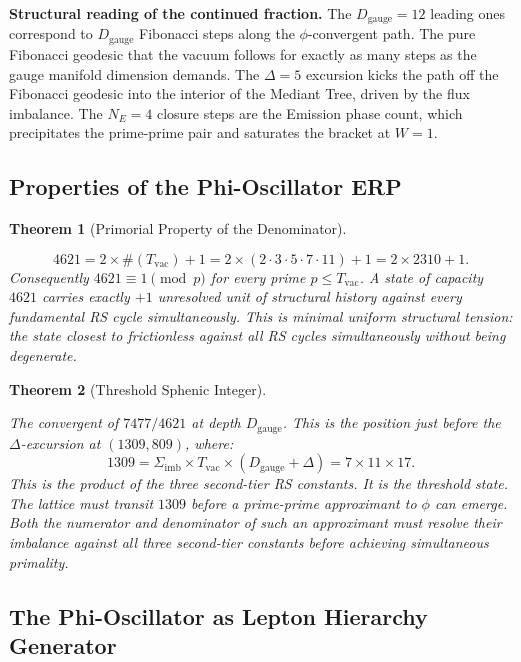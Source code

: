 \documentclass[11pt, letterpaper]{article}
\newcommand{\Dg}{D_{\mathrm{gauge}}}
\newcommand{\Sigimb}{\Sigma_{\mathrm{imb}}}
\theoremstyle{definition}
\theoremstyle{plain}
\newtheorem{theorem}{Theorem}[section]
\begin{document}
\begin{observebox}
\textbf{Structural reading of the continued fraction.}
The $\Dg=12$ leading ones correspond to $\Dg$ Fibonacci steps along the
$\phi$-convergent path. The pure Fibonacci geodesic that the vacuum follows
for exactly as many steps as the gauge manifold dimension demands.  The
$\Delta=5$ excursion kicks the path off the Fibonacci geodesic into the
interior of the Mediant Tree, driven by the flux imbalance.  The $N_E=4$
closure steps are the Emission phase count, which precipitates the
prime-prime pair and saturates the bracket at $W=1$.
\end{observebox}

\subsection{Properties of the Phi-Oscillator ERP}

\begin{theorem}[Primorial Property of the Denominator]\label{thm:primorial}
\begin{rsbox}
\[
4621 = 2\times\#(T_{\mathrm{vac}})+1
     = 2\times(2\cdot3\cdot5\cdot7\cdot11)+1
     = 2\times 2310+1.
\]
Consequently $4621\equiv 1\pmod{p}$ for every prime $p\leq T_{\mathrm{vac}}$.
A state of capacity $4621$ carries exactly $+1$ unresolved unit of structural
history against every fundamental RS cycle simultaneously.  This is
minimal uniform structural tension: the state closest to
frictionless against all RS cycles simultaneously without being degenerate.
\end{rsbox}
\end{theorem}

\begin{theorem}[Threshold Sphenic Integer]\label{thm:threshold}
\begin{rsbox}
The convergent of $7477/4621$ at depth $\Dg$. This is the position just before the $\Delta$-excursion at $(1309,809)$, where:
\[
1309 = \Sigimb\times T_{\mathrm{vac}}\times(\Dg+\Delta)
     = 7\times 11\times 17.
\]
This is the product of the three second-tier RS constants. It is the threshold state. The lattice must transit $1309$ before a prime-prime approximant to $\phi$ can emerge. Both the numerator and denominator of such an approximant must resolve their imbalance against all three second-tier constants before achieving simultaneous primality.
\end{rsbox}
\end{theorem}

\subsection{The Phi-Oscillator as Lepton Hierarchy Generator}
\end{document}
